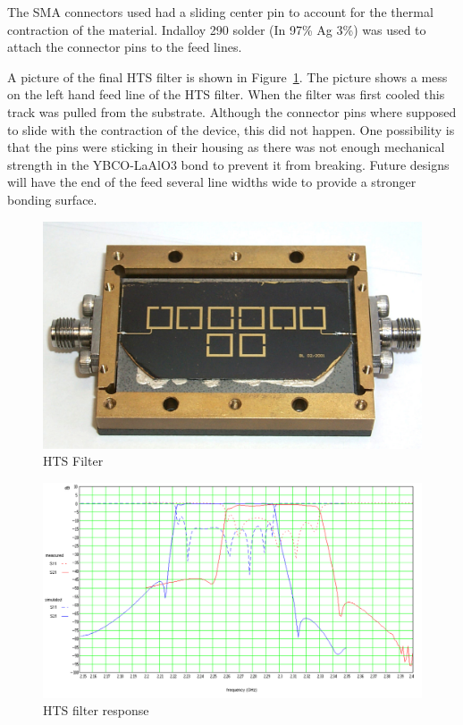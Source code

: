 The SMA connectors used had a sliding center pin to account for the thermal contraction of the material. Indalloy 290 solder (In 97\% Ag 3\%) was used to attach the connector pins to the feed lines.

A picture of the final HTS filter is shown in Figure~\ref{figure:test-hts-open}. The picture shows a mess on the left hand feed line of the HTS filter. When the filter was first cooled this track was pulled from the substrate. Although the connector pins where supposed to slide with the contraction of the device, this did not happen. One possibility is that the pins were sticking in their housing as there was not enough mechanical strength in the YBCO-LaAlO3 bond to prevent it from breaking. Future designs will have the end of the feed several line widths wide to provide a stronger bonding surface.

\begin{figure}[ht]
\begin{center}
\includegraphics[scale=0.25]{fig/test-hts-open.jpg}
\end{center}
\vspace{-1em}
\caption{HTS Filter}
\label{figure:test-hts-open}
\end{figure}

\begin{figure}[ht]
\hspace{-4em}
\includegraphics[scale=0.4]{fig/test-hts-response.pdf}
\vspace{-1em}
\caption{HTS filter response}
\label{figure:test-hts-response}
\end{figure}


